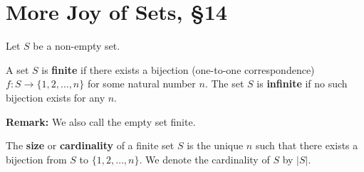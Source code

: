 


%


\section{{More Joy of Sets,  \framebox\S 14}}%
% 

%
\thispagestyle{fancy}

%
%

Let $S$ be a non-empty set.

\begin{defn}
A set $S$ is {\bf finite} if there exists a bijection (one-to-one correspondence) $f: S \to \{1, 2, \dots, n\}$ for some natural number $n$. The set $S$ is {\bf infinite} if no such bijection exists for any $n$. 
\end{defn}

{\bf Remark:} We also call the empty set finite.

\begin{defn}
The {\bf size} or {\bf cardinality} of a finite set $S$ is the unique $n$ such that there exists a bijection from $S$ to $\{1, 2, \dots, n\}$. We denote the cardinality of $S$ by $|S|$.
\end{defn}

